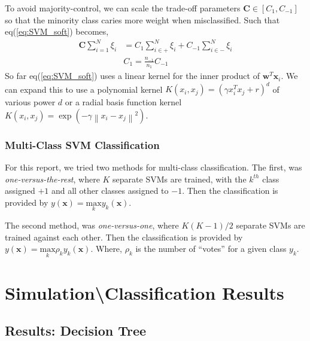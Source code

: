 \documentclass[fleqn]{article}
\begin{document}
%
To avoid majority-control, we can scale the trade-off parameters $\mathbf{C} \in [C_{1}, C_{-1}]$ so that the minority class caries more weight when misclassified. Such that eq(\ref{eq:SVM_soft}) becomes,
%
\begin{equation}
\label{eq:scaledC}
\begin{aligned}
	\mathbf{C} \sum_{i=1}^N \xi_i &= C_1 \sum_{i \in +}^N \xi_i + C_{-1} \sum_{i \in -}^N \xi_i\\
	& C_1 = \frac{n_{-1}}{n_{1}} C_{-1}
\end{aligned}
\end{equation}
%
So far eq(\ref{eq:SVM_soft}) uses a linear kernel for the inner product of $\mathbf{w}^T \mathbf{x}_i$.  We can expand this to use a polynomial kernel $K(x_i , x_j) = (\gamma x_i^T x_j + r)^d$ of various power $d$ or a radial basis function kernel $K(x_i , x_j) = \exp(-\gamma \left\|x_i - x_j\right\|^2)$. 

\subsubsection{Multi-Class SVM Classification}
\label{sub:multiSVM}
For this report, we tried two methods for multi-class classification.  The first, was \textit{one-versus-the-rest}\cite{vapnik:1998}, where $K$ separate SVMs are trained, with the $k^{th}$ class assigned $+1$ and all other classes assigned to $-1$.  Then the classification is provided by $y(\mathbf{x}) = \underset{k}{\text{max}} y_k (\mathbf{x})$.

The second method, was \textit{one-versus-one}\cite{vapnik:1998}, where $K(K-1)/2$ separate SVMs are trained against each other.  Then the classification is provided by $y(\mathbf{x}) = \underset{k}{\text{max}} \rho_k y_k (\mathbf{x})$.  Where, $\rho_k$ is the number of ``votes'' for a given class $y_k$.

\section[Results]{Simulation\textbackslash Classification Results}
\label{sec:Results}

\subsection{Results: Decision Tree}
\label{sub:resultsTrees}
\end{document}
